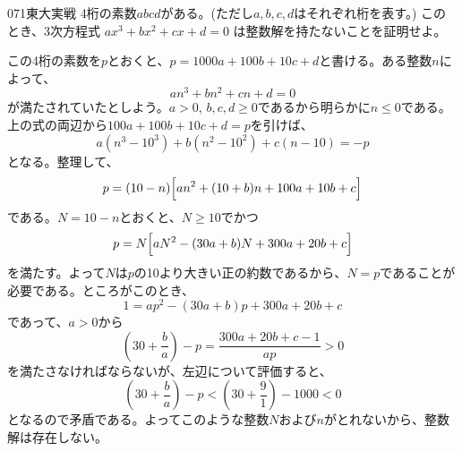 \begin{prob}{071}{}{東大実戦}
 4桁の素数$abcd$がある。(ただし$a, b, c, d$はそれぞれ桁を表す。) このとき、3次方程式 $ax^3+bx^2+cx+d=0$ は整数解を持たないことを証明せよ。
\end{prob}
この4桁の素数を$p$とおくと、$p=1000a+100b+10c+d$と書ける。ある整数$n$によって、
\[ an^3+bn^2+cn+d=0 \]
が満たされていたとしよう。$a>0$, $b, c, d\ge 0$であるから明らかに$n\le 0$である。上の式の両辺から$100a+100b+10c+d=p$を引けば、
\[ a(n^3-10^3)+b(n^2-10^2)+c(n-10)=-p \]
となる。整理して、
\[ p=(10-n)\Bigl[an^2+(10+b)n+100a+10b+c\Bigr] \]
である。$N=10-n$とおくと、$N\ge 10$でかつ
\[ p=N\Bigl[aN^2-(30a+b)N+300a+20b+c\Bigr] \]
を満たす。よって$N$は$p$の10より大きい正の約数であるから、$N=p$であることが必要である。ところがこのとき、
\[ 1=ap^2-(30a+b)p+300a+20b+c \]
であって、$a>0$から
\[ \left(30+\frac{b}{a}\right)-p = \frac{300a+20b+c-1}{ap}>0 \]
を満たさなければならないが、左辺について評価すると、
\[ \left(30+\frac{b}{a}\right)-p < \left(30+\frac{9}{1}\right)-1000 < 0 \]
となるので矛盾である。よってこのような整数$N$および$n$がとれないから、整数解は存在しない。